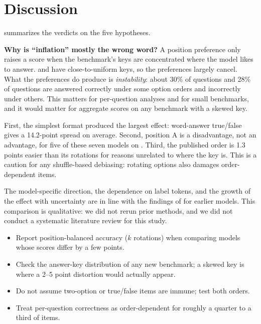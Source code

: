 \section{Discussion}
\label{sec:discussion}



 summarizes the verdicts on the five hypotheses.

{\bf Why is ``inflation'' mostly the wrong word?}
A position preference only raises a score when the benchmark's keys are concentrated where the model likes to answer.
\mmlu and \csqa have close-to-uniform keys, so the preferences largely cancel.
What the preferences do produce is \emph{instability}: about 30\% of \mmlu questions and 28\% of \csqa questions are answered correctly under some option orders and incorrectly under others.
This matters for per-question analyses and for small benchmarks, and it would matter for aggregate scores on any benchmark with a skewed key.

First, the simplest format produced the largest effect: word-answer true/false gives a 14.2-point spread on average.
Second, position A is a disadvantage, not an advantage, for five of these seven models on \mmlu.
Third, the published \mmlu order is 1.3 points easier than its rotations for reasons unrelated to where the key is.
This is a caution for any shuffle-based debiasing: rotating options also damages order-dependent items.

The model-specific direction, the dependence on label tokens, and the growth of the effect with uncertainty are in line with the findings of \citet{zheng2024selectors} for earlier models.
This comparison is qualitative: we did not rerun prior methods, and we did not conduct a systematic literature review for this study.

\begin{itemize}[leftmargin=*,itemsep=0pt,topsep=0pt]
    \item Report position-balanced accuracy ($k$ rotations) when comparing models whose scores differ by a few points.
    \item Check the answer-key distribution of any new benchmark; a skewed key is where a 2--5 point distortion would actually appear.
    \item Do not assume two-option or true/false items are immune; test both orders.
    \item Treat per-question correctness as order-dependent for roughly a quarter to a third of items.
\end{itemize}

